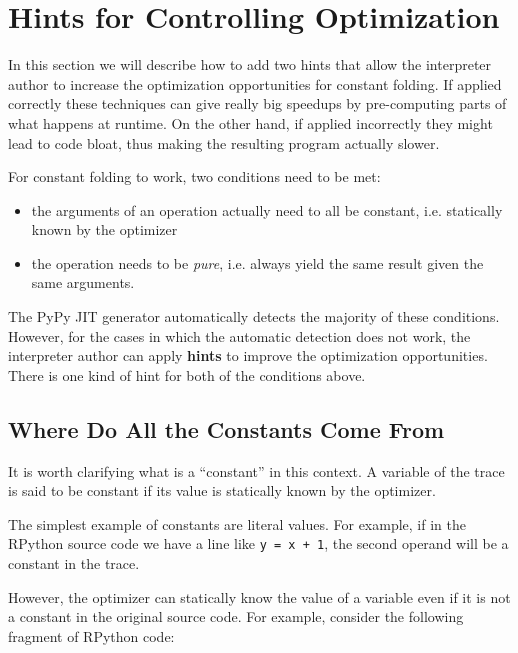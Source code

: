 \documentclass{sigplanconf}
\begin{document}



\section{Hints for Controlling Optimization}
\label{sec:hints}

In this section we will describe how to add two hints that allow the
interpreter author to increase the optimization opportunities for constant
folding. If applied correctly these techniques can give really big speedups by
pre-computing parts of what happens at runtime. On the other
hand, if applied incorrectly they might lead to code bloat, thus making the
resulting program actually slower.

For constant folding to work, two conditions need to be met:

\begin{itemize}
    \item the arguments of an operation actually need to all be constant,
    i.e. statically known by the optimizer
    \item the operation needs to be \emph{pure}, i.e. always yield the same result given
    the same arguments.
\end{itemize}

The PyPy JIT generator automatically detects the majority of these conditions.
However, for the cases in which the automatic detection does not work, the
interpreter author can apply \textbf{hints} to improve the optimization
opportunities. There is one kind of hint for both of the conditions above.


\subsection{Where Do All the Constants Come From}

It is worth clarifying what is a ``constant'' in this context.  A variable of
the trace is said to be constant if its value is statically known by the
optimizer.

The simplest example of constants are literal values.  For example, if in the
RPython source code we have a line like \texttt{y = x + 1}, the second operand will
be a constant in the trace.

However, the optimizer can statically know the value of a variable even if it
is not a constant in the original source code. For example, consider the
following fragment of RPython code:
\end{document}
